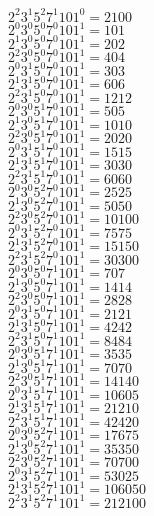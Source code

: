 \documentclass{article}
\begin{document}
$2^{2}3^{1}5^{2}7^{1}101^{0}=2100$\\
$2^{0}3^{0}5^{0}7^{0}101^{1}=101$\\
$2^{1}3^{0}5^{0}7^{0}101^{1}=202$\\
$2^{2}3^{0}5^{0}7^{0}101^{1}=404$\\
$2^{0}3^{1}5^{0}7^{0}101^{1}=303$\\
$2^{1}3^{1}5^{0}7^{0}101^{1}=606$\\
$2^{2}3^{1}5^{0}7^{0}101^{1}=1212$\\
$2^{0}3^{0}5^{1}7^{0}101^{1}=505$\\
$2^{1}3^{0}5^{1}7^{0}101^{1}=1010$\\
$2^{2}3^{0}5^{1}7^{0}101^{1}=2020$\\
$2^{0}3^{1}5^{1}7^{0}101^{1}=1515$\\
$2^{1}3^{1}5^{1}7^{0}101^{1}=3030$\\
$2^{2}3^{1}5^{1}7^{0}101^{1}=6060$\\
$2^{0}3^{0}5^{2}7^{0}101^{1}=2525$\\
$2^{1}3^{0}5^{2}7^{0}101^{1}=5050$\\
$2^{2}3^{0}5^{2}7^{0}101^{1}=10100$\\
$2^{0}3^{1}5^{2}7^{0}101^{1}=7575$\\
$2^{1}3^{1}5^{2}7^{0}101^{1}=15150$\\
$2^{2}3^{1}5^{2}7^{0}101^{1}=30300$\\
$2^{0}3^{0}5^{0}7^{1}101^{1}=707$\\
$2^{1}3^{0}5^{0}7^{1}101^{1}=1414$\\
$2^{2}3^{0}5^{0}7^{1}101^{1}=2828$\\
$2^{0}3^{1}5^{0}7^{1}101^{1}=2121$\\
$2^{1}3^{1}5^{0}7^{1}101^{1}=4242$\\
$2^{2}3^{1}5^{0}7^{1}101^{1}=8484$\\
$2^{0}3^{0}5^{1}7^{1}101^{1}=3535$\\
$2^{1}3^{0}5^{1}7^{1}101^{1}=7070$\\
$2^{2}3^{0}5^{1}7^{1}101^{1}=14140$\\
$2^{0}3^{1}5^{1}7^{1}101^{1}=10605$\\
$2^{1}3^{1}5^{1}7^{1}101^{1}=21210$\\
$2^{2}3^{1}5^{1}7^{1}101^{1}=42420$\\
$2^{0}3^{0}5^{2}7^{1}101^{1}=17675$\\
$2^{1}3^{0}5^{2}7^{1}101^{1}=35350$\\
$2^{2}3^{0}5^{2}7^{1}101^{1}=70700$\\
$2^{0}3^{1}5^{2}7^{1}101^{1}=53025$\\
$2^{1}3^{1}5^{2}7^{1}101^{1}=106050$\\
$2^{2}3^{1}5^{2}7^{1}101^{1}=212100$\\
\end{document}

